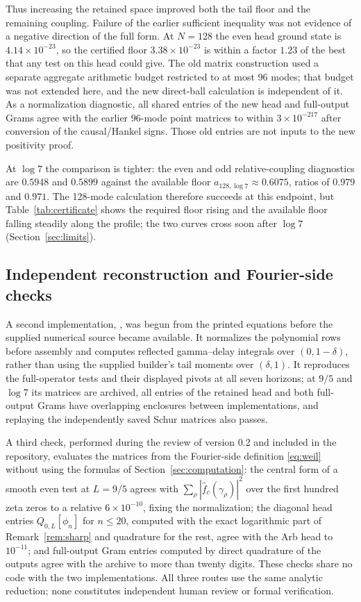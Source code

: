 \documentclass[11pt]{article}
\numberwithin{equation}{section}
\theoremstyle{definition}
\theoremstyle{remark}
\begin{document}
Thus increasing the retained space improved both the tail floor and the
remaining coupling. Failure of the earlier sufficient inequality was not
evidence of a negative direction of the full form. At $N=128$ the even head
ground state is $4.14\times10^{-23}$, so the certified floor
$3.38\times10^{-23}$ is within a factor $1.23$ of the best that any test on
this head could give. The old matrix construction used a separate aggregate
arithmetic budget restricted to at most 96 modes; that budget was not
extended here, and the new direct-ball calculation is independent of it. As a
normalization diagnostic, all shared entries of the new head and full-output
Grams agree with the earlier 96-mode point matrices to within
$3\times10^{-217}$ after conversion of the causal/Hankel signs. Those old
entries are not inputs to the new positivity proof.

At $\log7$ the comparison is tighter: the even and odd relative-coupling
diagnostics are $0.5948$ and $0.5899$ against the available floor
$a_{128,\log7}\approx0.6075$, ratios of $0.979$ and $0.971$. The 128-mode
calculation therefore succeeds at this endpoint, but Table~\ref{tab:certificate}
shows the required floor rising and the available floor falling steadily
along the profile; the two curves cross soon after $\log7$
(Section~\ref{sec:limits}).

\subsection{Independent reconstruction and Fourier-side checks}

A second implementation, , was begun from the
printed equations before the supplied numerical source became available.
It normalizes the polynomial rows before assembly and computes reflected
gamma--delay integrals over $(0,1-\delta)$, rather than using the supplied
builder's tail moments over $(\delta,1)$. It reproduces the full-operator
tests and their displayed pivots at all seven horizons; at $9/5$ and $\log7$
its matrices are archived, all entries of the retained head and both
full-output Grams have overlapping enclosures between implementations, and
replaying the independently saved Schur matrices also passes.

A third check, performed during the review of version 0.2 and included in the
repository, evaluates the matrices from the Fourier-side definition
\eqref{eq:weil} without using the formulas of Section~\ref{sec:computation}:
the central form of a smooth even test at $L=9/5$ agrees with
$\sum_\rho|\widehat f_c(\gamma_\rho)|^2$ over the first hundred zeta zeros to
a relative $6\times10^{-10}$, fixing the normalization; the diagonal head
entries $Q_{0,L}[\phi_n]$ for $n\le20$, computed with the exact logarithmic
part of Remark~\ref{rem:sharp} and quadrature for the rest, agree with the
Arb head to $10^{-11}$; and full-output Gram entries computed by direct
quadrature of the outputs agree with the archive to more than twenty digits.
These checks share no code with the two implementations. All three routes
use the same analytic reduction; none constitutes independent human review or
formal verification.
\end{document}
